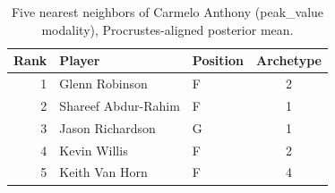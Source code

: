 \begin{table}[htbp]
  \centering\small
  \begin{tabular}{rllc}
    \toprule
    Rank & Player & Position & Archetype \\
    \midrule
    1 & Glenn Robinson & F & 2 \\
    2 & Shareef Abdur-Rahim & F & 1 \\
    3 & Jason Richardson & G & 1 \\
    4 & Kevin Willis & F & 2 \\
    5 & Keith Van Horn & F & 4 \\
    \bottomrule
  \end{tabular}
  \caption{Five nearest neighbors of Carmelo Anthony (peak_value modality), Procrustes-aligned posterior mean.}
  \label{tab:Carmelo_Anthony_neighbors_peak_value}
\end{table}

